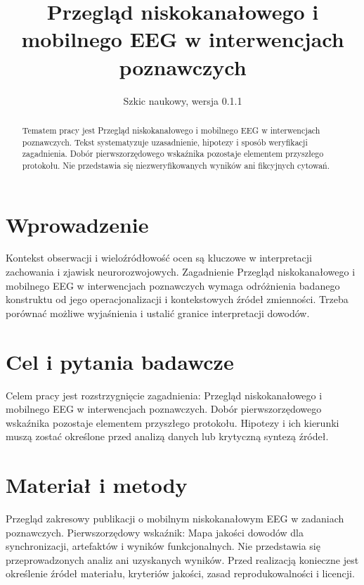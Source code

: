 \documentclass[11pt,a4paper]{article}
\title{Przegląd niskokanałowego i mobilnego EEG w interwencjach poznawczych}
\author{}
\date{Szkic naukowy, wersja 0.1.1}
\begin{document}
\maketitle

\begin{abstract}

Tematem pracy jest Przegląd niskokanałowego i mobilnego EEG w interwencjach poznawczych. Tekst systematyzuje uzasadnienie, hipotezy i sposób weryfikacji zagadnienia. Dobór pierwszorzędowego wskaźnika pozostaje elementem przyszłego protokołu. Nie przedstawia się niezweryfikowanych wyników ani fikcyjnych cytowań.

\end{abstract}

\section{Wprowadzenie}

Kontekst obserwacji i wieloźródłowość ocen są kluczowe w interpretacji zachowania i zjawisk neurorozwojowych. Zagadnienie Przegląd niskokanałowego i mobilnego EEG w interwencjach poznawczych wymaga odróżnienia badanego konstruktu od jego operacjonalizacji i kontekstowych źródeł zmienności. Trzeba porównać możliwe wyjaśnienia i ustalić granice interpretacji dowodów.

\section{Cel i pytania badawcze}

Celem pracy jest rozstrzygnięcie zagadnienia: Przegląd niskokanałowego i mobilnego EEG w interwencjach poznawczych. Dobór pierwszorzędowego wskaźnika pozostaje elementem przyszłego protokołu. Hipotezy i ich kierunki muszą zostać określone przed analizą danych lub krytyczną syntezą źródeł.

\section{Materiał i metody}

Przegląd zakresowy publikacji o mobilnym niskokanałowym EEG w zadaniach poznawczych. Pierwszorzędowy wskaźnik: Mapa jakości dowodów dla synchronizacji, artefaktów i wyników funkcjonalnych. Nie przedstawia się przeprowadzonych analiz ani uzyskanych wyników. Przed realizacją konieczne jest określenie źródeł materiału, kryteriów jakości, zasad reprodukowalności i licencji.
\end{document}

